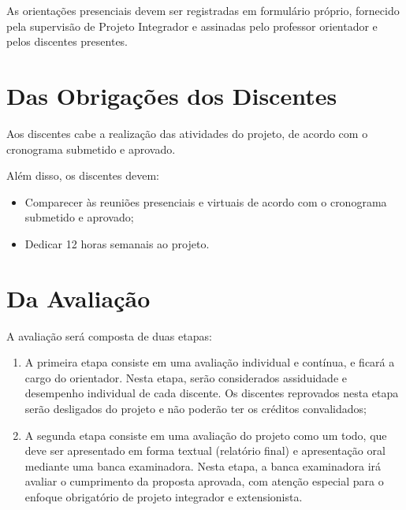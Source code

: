 \documentclass[11pt,a4paper]{report}
\begin{document}


As orientações presenciais devem ser registradas em formulário próprio, fornecido pela supervisão de Projeto Integrador e assinadas pelo professor orientador e pelos discentes presentes.

\section{Das Obrigações dos Discentes}

Aos discentes cabe a realização das atividades do projeto, de acordo com o cronograma submetido e aprovado.

Além disso, os discentes devem:

\begin{itemize}
    \item Comparecer às reuniões presenciais e virtuais de acordo com o cronograma submetido e aprovado;
    \item Dedicar 12 horas semanais ao projeto.

\end{itemize}

\section{Da Avaliação}

A avaliação será composta de duas etapas:

\begin{enumerate}

\item A primeira etapa consiste em uma avaliação individual e contínua, e ficará a cargo do orientador. Nesta etapa, serão considerados assiduidade e desempenho individual de cada discente. Os discentes reprovados nesta etapa serão desligados do projeto e não poderão ter os créditos convalidados;

\item A segunda etapa consiste em uma avaliação do projeto como um todo, que deve ser apresentado em forma textual (relatório final) e apresentação oral mediante uma banca examinadora. Nesta etapa, a banca examinadora irá avaliar o cumprimento da proposta aprovada, com atenção especial para o enfoque obrigatório de projeto integrador e extensionista.

\end{enumerate}
\end{document}
